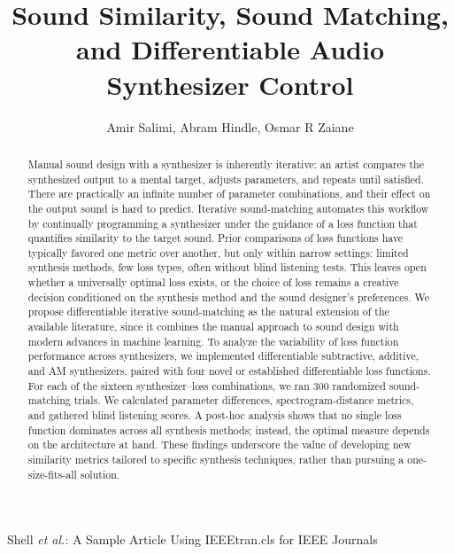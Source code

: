 \documentclass[lettersize,journal]{IEEEtran}
\begin{document}
\title{Sound Similarity, Sound Matching, and Differentiable Audio Synthesizer Control}

\author{Amir Salimi, Abram Hindle, Osmar R Zaiane}

%
{Shell \MakeLowercase{\textit{et al.}}: A Sample Article Using IEEEtran.cls for IEEE Journals}

\maketitle

\begin{abstract}
Manual sound design with a synthesizer is inherently iterative: an artist compares the synthesized output to a mental target, adjusts parameters, and repeats until satisfied. There are practically an infinite number of parameter combinations, and their effect on the output sound is hard to predict. Iterative sound-matching automates this workflow by continually programming a synthesizer under the guidance of a loss function that quantifies similarity to the target sound. Prior comparisons of loss functions have typically favored one metric over another, but only within narrow settings: limited synthesis methods, few loss types, often without blind listening tests. This leaves open whether a universally optimal loss exists, or the choice of loss remains a creative decision conditioned on the synthesis method and the sound designer's preferences. We propose differentiable iterative sound-matching as the natural extension of the available literature, since it combines the manual approach to sound design with modern advances in machine learning. To analyze the variability of loss function performance across synthesizers, we implemented differentiable subtractive, additive, and AM synthesizers, paired with four novel or established differentiable loss functions. For each of the sixteen synthesizer–loss combinations, we ran 300 randomized sound-matching trials. We calculated parameter differences, spectrogram-distance metrics, and gathered blind listening scores. A post-hoc analysis shows that no single loss function dominates across all synthesis methods; instead, the optimal measure depends on the architecture at hand. These findings underscore the value of developing new similarity metrics tailored to specific synthesis techniques, rather than pursuing a one-size-fits-all solution.
\end{abstract}
\end{document}
